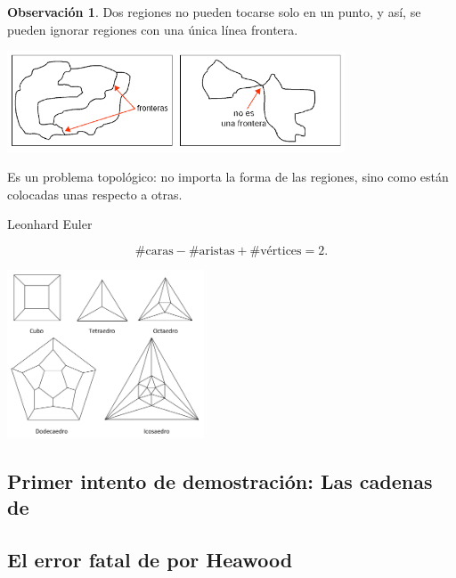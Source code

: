 \documentclass[spanish,utf8]{beamer}
\theoremstyle{definition}
\newtheorem{remark}{Observación}
\begin{document}
\begin{frame}{\insertsubsection}
\begin{remark}{}
	Dos regiones no pueden tocarse solo en un punto, y así, se pueden ignorar regiones con una única línea frontera.
\end{remark}
\begin{center}
	\includegraphics[height=3cm]{fronteras.png}
\end{center}

Es un problema topológico: no importa la forma de las regiones, sino como están colocadas unas respecto a otras.
\end{frame}

\begin{frame}{\insertsubsection}\transblindsvertical
Leonhard Euler
\begin{theorem}
	$$
	\#\text{caras} - \#\text{aristas} + \#\text{vértices} = 2.
	$$
\end{theorem}
\begin{center}
	\includegraphics[height=5cm]{poliedros2.jpg}
\end{center}
\end{frame}

\subsection{Primer intento de demostración: Las cadenas de \citeauthor{kempe}}

\subsection{El error fatal de \citeauthor{kempe} por Heawood}
\end{document}
